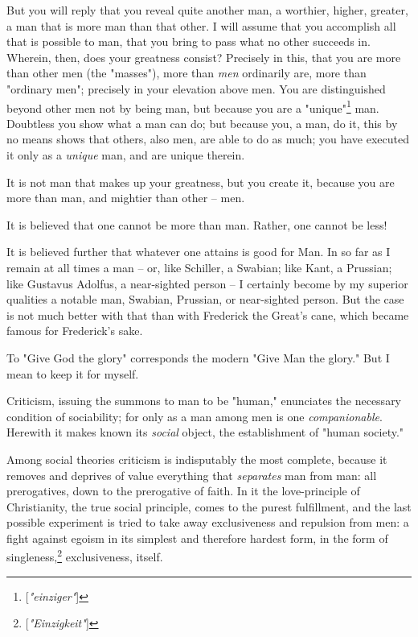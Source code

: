 But you will reply that you reveal quite another man, a worthier, higher, 
greater, a man that is more man than that other. I will assume that you 
accomplish all that is possible to man, that you bring to pass what no other 
succeeds in. Wherein, then, does your greatness consist? Precisely in this, 
that you are more than other men (the "{}masses"{}), more than \textit{men} 
ordinarily are, more than "{}ordinary men"{}; precisely in your elevation 
above men. You are distinguished beyond other men not by being man, but 
because you are a "{}unique"{}\footnote{[\textit{"{}einziger"{}}]} man. 
Doubtless you show what a man can do; but because you, a man, do it, this by 
no means shows that others, also men, are able to do as much; you have 
executed it only as a \textit{unique} man, and are unique therein.

It is not man that makes up your greatness, but you create it, because you are 
more than man, and mightier than other -- men.

It is believed that one cannot be more than man. Rather, one cannot be less!

It is believed further that whatever one attains is good for Man. In so far as 
I remain at all times a man -- or, like Schiller, a Swabian; like Kant, a 
Prussian; like Gustavus Adolfus, a near-sighted person -- I certainly become 
by my superior qualities a notable man, Swabian, Prussian, or near-sighted 
person. But the case is not much better with that than with Frederick the 
Great's cane, which became famous for Frederick's sake.

To "{}Give God the glory"{} corresponds the modern "{}Give Man the glory."{} 
But I mean to keep it for myself.

Criticism, issuing the summons to man to be "{}human,"{} enunciates the 
necessary condition of sociability; for only as a man among men is one 
\textit{companionable}. Herewith it makes known its \textit{social} object, 
the establishment of "{}human society."{}

Among social theories criticism is indisputably the most complete, because it 
removes and deprives of value everything that \textit{separates} man from man: 
all prerogatives, down to the prerogative of faith. In it the love-principle 
of Christianity, the true social principle, comes to the purest fulfillment, 
and the last possible experiment is tried to take away exclusiveness and 
repulsion from men: a fight against egoism in its simplest and therefore 
hardest form, in the form of singleness,\footnote{[\textit{"{}Einzigkeit"{}}]} 
exclusiveness, itself.

